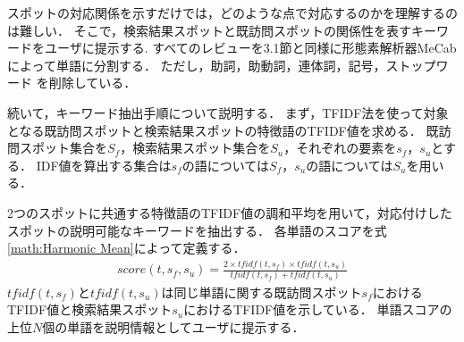 \documentclass{deimj}
\begin{document}


スポットの対応関係を示すだけでは，どのような点で対応するのかを理解するのは難しい．
そこで，検索結果スポットと既訪問スポットの関係性を表すキーワードをユーザに提示する.
すべてのレビューを3.1節と同様に形態素解析器MeCabによって単語に分割する．
ただし，助詞，助動詞，連体詞，記号，ストップワード を削除している．

続いて，キーワード抽出手順について説明する．
まず，TFIDF法を使って対象となる既訪問スポットと検索結果スポットの特徴語のTFIDF値を求める．
既訪問スポット集合を$S_f$，検索結果スポット集合を$S_u$，それぞれの要素を$s_f$，$s_u$とする．
IDF値を算出する集合は$s_f$の語については$S_f$，$s_u$の語については$S_u$を用いる．

2つのスポットに共通する特徴語のTFIDF値の調和平均を用いて，対応付けしたスポットの説明可能なキーワードを抽出する．
各単語のスコアを式\ref{math:Harmonic Mean}によって定義する．
\begin{eqnarray}
  score(t,s_f,s_u) = \frac{2 \times tfidf(t,s_f) \times tfidf(t,s_u)}{tfidf(t,s_f) + tfidf(t,s_u)}
  \label{math:Harmonic Mean}
\end{eqnarray}
$tfidf(t,s_f)$と$tfidf(t,s_u)$は同じ単語に関する既訪問スポット$s_f$におけるTFIDF値と検索結果スポット$s_u$におけるTFIDF値を示している．
単語スコアの上位$N$個の単語を説明情報としてユーザに提示する．


\end{document}
